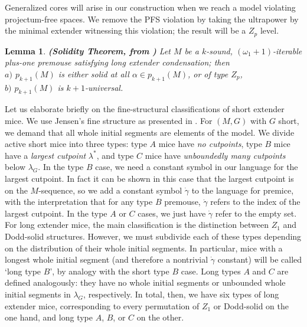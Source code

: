 \documentclass[12pt]{article}
\newtheorem{lem}[thm]{Lemma}
\begin{document}
Generalized cores will arise in our construction when we reach a model violating projectum-free spaces.  We remove the PFS violation by taking the ultrapower by the minimal extender witnessing this violation; the result will be a $Z_p$ level.\\



\bigskip

\begin{lem} \label{solidity theorem}
\textbf{(Solidity Theorem, from \cite{FSPIPM})}
Let $M$ be a $k$-sound, $(\omega_1 + 1)$-iterable plus-one premouse satisfying long extender condensation; then\\

\indent \indent $a)$ $p_{k+1} (M)$ is either solid at all $\alpha \in p_{k+1} (M)$, or of type $Z_p$,\\

\indent \indent $b)$ $p_{k+1} (M)$ is $k+1$-universal.
\end{lem}

\bigskip


Let us elaborate briefly on the fine-structural classifications of short extender mice.  We use Jensen's fine structure as presented in \cite{zeman square proof}.  For $(M, G)$ with $G$ short, we demand that all whole initial segments are elements of the model.  We divide active short mice into three types: type $A$ mice have \textit{no cutpoints}, type $B$ mice have a \textit{largest cutpoint} $\lambda^*$, and type $C$ mice have \textit{unboundedly many cutpoints} below $\lambda_G$.  In the type $B$ case, we need a constant symbol in our language for the largest cutpoint.  In fact it can be shown in this case that the largest cutpoint is on the $M$-sequence, so we add a constant symbol $\dot{\gamma}$ to the language for premice, with the interpretation that for any type $B$ premouse, $\dot{\gamma}$ refers to the index of the largest cutpoint.  In the type $A$ or $C$ cases, we just have $\dot{\gamma}$ refer to the empty set.\\

For long extender mice, the main classification is the distinction between $Z_1$ and Dodd-solid structures.  However, we must subdivide each of these types depending on the distribution of their whole initial segments.  In particular, mice with a longest whole initial segment (and therefore a nontrivial $\dot{\gamma}$ constant) will be called `long type $B$', by analogy with the short type $B$ case.  Long types $A$ and $C$ are defined analogously: they have no whole initial segments or unbounded whole initial segments in $\lambda_G$, respectively.  In total, then, we have six types of long extender mice, corresponding to every permutation of $Z_1$ or Dodd-solid on the one hand, and long type $A$, $B$, or $C$ on the other.\\
\end{document}
